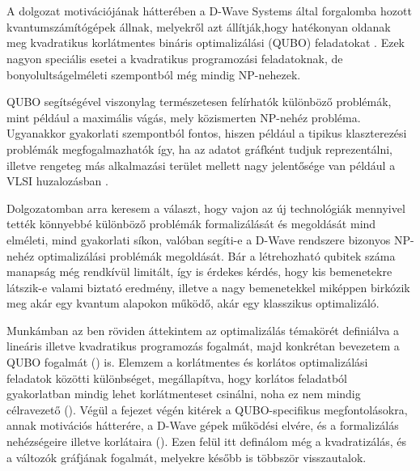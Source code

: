 
\chapter{\bevezetes}

A dolgozat motivációjának hátterében a D-Wave Systems által forgalomba hozott kvantumszámítógépek állnak, melyekről azt állítják,hogy hatékonyan oldanak meg kvadratikus korlátmentes bináris optimalizálási (QUBO) feladatokat \cite{DWaveSystem}. Ezek nagyon speciális esetei a kvadratikus programozási feladatoknak, de bonyolultságelméleti szempontból még mindig NP-nehezek.

QUBO segítségével viszonylag természetesen felírhatók különböző problémák, mint például a maximális vágás, mely közismerten NP-nehéz probléma. Ugyanakkor gyakorlati szempontból fontos, hiszen például a tipikus klaszterezési problémák megfogalmazhatók így, ha az adatot gráfként tudjuk reprezentálni, illetve rengeteg más alkalmazási terület mellett nagy jelentősége van például a VLSI huzalozásban \cite{wiki:VLSI}\cite{wiki:Maximum_cut}.

Dolgozatomban arra keresem a választ, hogy vajon az új technológiák mennyivel tették könnyebbé különböző problémák formalizálását és megoldását mind elméleti, mind gyakorlati síkon, valóban segíti-e a D-Wave rendszere bizonyos NP-nehéz optimalizálási problémák megoldását. Bár a létrehozható qubitek száma manapság még rendkívül limitált, így is érdekes kérdés, hogy kis bemenetekre látszik-e valami biztató eredmény, illetve a nagy bemenetekkel miképpen birkózik meg akár egy kvantum alapokon működő, akár egy klasszikus optimalizáló.

Munkámban az ben röviden áttekintem az optimalizálás témakörét definiálva a lineáris illetve kvadratikus programozás fogalmát, majd konkrétan bevezetem a QUBO fogalmát () is. Elemzem a korlátmentes és korlátos optimalizálási feladatok közötti különbséget, megállapítva, hogy korlátos feladatból gyakorlatban mindig lehet korlátmenteset csinálni, noha ez nem mindig célravezető ().
Végül a fejezet végén kitérek a QUBO-specifikus megfontolásokra, annak motivációs hátterére, a D-Wave gépek működési elvére, és a formalizálás nehézségeire illetve korlátaira (). Ezen felül itt definálom még a kvadratizálás, és a változók gráfjának fogalmát, melyekre később is többször visszautalok.

